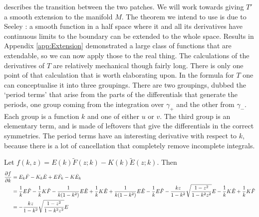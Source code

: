 describes the transition between the two patches. We will work towards giving $T'$ a smooth extension to the manifold $M$. The theorem we intend to use is due to Seeley \cite{Seeley1964}: a smooth function in a half space where it and all its derivatives have continuous limits to the boundary can be extended to the whole space. Results in Appendix \ref{app:Extension} demonstrated a large class of functions that are extendable, so we can now apply those to the real thing. The calculations of the derivatives of $T$ are relatively mechanical though fairly long. There is only one point of that calculation that is worth elaborating upon. In the formula for $T$ one can conceptualise it into three groupings. There are two groupings, dubbed the `period terms' that arise from the parts of the differentials that generate the periods, one group coming from the integration over $γ_+$ and the other from $γ_-$. Each group is a function $k$ and one of either $u$ or $v$. The third group is an elementary term, and is made of leftovers that give the differentials in the correct symmetries. The period terms have an interesting derivative with respect to $k$, because there is a lot of cancellation that completely remove incomplete integrals.

Let $f(k,z) = E(k)\tilde{F}(z; k) - K(k)\tilde{E}(z; k)$. Then
\begin{align*}
\frac{\partial f}{\partial k}
&= E_k \tilde{F} - K_k \tilde{E} + E\tilde{F}_k - K\tilde{E}_k \\
&= \frac{1}{k}E \tilde{F} - \frac{1}{k}K \tilde{F} - \frac{1}{k(1-k^2)}E \tilde{E} + \frac{1}{k}K \tilde{E} + \frac{1}{k(1-k^2)}E \tilde{E} - \frac{1}{k}E \tilde{F} - \frac{kz}{1-k^2}\sqrt{\frac{1-z^2}{1-k^2z^2}}E - \frac{1}{k}K\tilde{E} + \frac{1}{k}K\tilde{F} \\
&= - \frac{kz}{1-k^2}\sqrt{\frac{1-z^2}{1-k^2z^2}}E
\end{align*}

